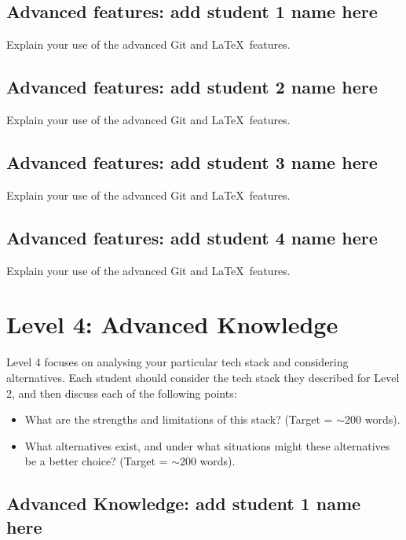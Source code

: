 \documentclass[a4paper, 11pt]{report}
\begin{document}
\subsection{Advanced features: add student 1 name here}

Explain your use of the advanced Git and \LaTeX\ features. 

\subsection{Advanced features: add student 2 name here}

Explain your use of the advanced Git and \LaTeX\ features. 

\subsection{Advanced features: add student 3 name here}

Explain your use of the advanced Git and \LaTeX\ features. 

\subsection{Advanced features: add student 4 name here}

Explain your use of the advanced Git and \LaTeX\ features. 




\newpage
\section{Level 4: Advanced Knowledge}

Level 4 focuses on analysing your particular tech stack and considering alternatives. Each student should consider the tech stack they described for Level 2, and then discuss each of the following points:
\begin{itemize}
    \item What are the strengths and limitations of this stack? (Target = $\sim$200 words).
    \item What alternatives exist, and under what situations might these alternatives be a better choice? (Target = $\sim$200 words).
\end{itemize}

\subsection{Advanced Knowledge: add student 1 name here}
\end{document}
